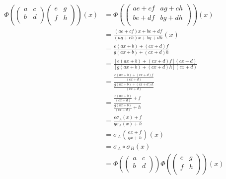 \begin{solution}
\begin{enumerate}[(i)]
\begin{align*}
\Phi (\begin{pmatrix} a & c \\ b & d \\ \end{pmatrix}
\begin{pmatrix} e & g \\ f & h \\ \end{pmatrix})(x) &= 
\Phi (\begin{pmatrix} ae + cf & ag + ch \\ be + df & bg + dh \\ \end{pmatrix})(x) \\
&= \frac{(ae+cf)x + be+df}{(ag+ch)x+bg+dh} (x)\\
&= \frac{e(ax+b) + (cx+d)f}{g(ax+b)+ (cx+d)h} \\
&= \frac{[e(ax+b) + (cx+d)f](cx+d)}{[g(ax+b)+ (cx+d)h](cx+d)} \\
&= \frac{\frac{e(ax+b) + (cx+d)f}{(cx+d)}}{\frac{g(ax+b) + (cx+d)h}{(cx+d)}} \\
&= \frac{\frac{e(ax+b)}{(cx+d)}+f}{\frac{g(ax+b)}{(cx+d)}+h} \\
&= \frac{e\sigma_A(x)+f}{g\sigma_A(x)+h} \\
&= \sigma_A(\frac{ex+f}{gx+h})(x) \\
&= \sigma_A \circ \sigma_B (x) \\
&= \Phi(\begin{pmatrix} a & c \\ b & d \\ \end{pmatrix}) \Phi(\begin{pmatrix} e & g \\ f & h \\ \end{pmatrix}) (x)
\end{align*}


\end{enumerate}
\end{solution}
